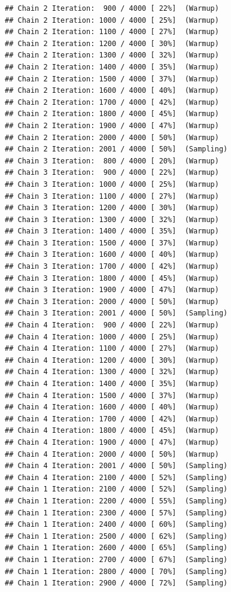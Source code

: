 \documentclass[
]{article}
\begin{document}
\begin{verbatim}
## Chain 2 Iteration:  900 / 4000 [ 22%]  (Warmup) 
## Chain 2 Iteration: 1000 / 4000 [ 25%]  (Warmup) 
## Chain 2 Iteration: 1100 / 4000 [ 27%]  (Warmup) 
## Chain 2 Iteration: 1200 / 4000 [ 30%]  (Warmup) 
## Chain 2 Iteration: 1300 / 4000 [ 32%]  (Warmup) 
## Chain 2 Iteration: 1400 / 4000 [ 35%]  (Warmup) 
## Chain 2 Iteration: 1500 / 4000 [ 37%]  (Warmup) 
## Chain 2 Iteration: 1600 / 4000 [ 40%]  (Warmup) 
## Chain 2 Iteration: 1700 / 4000 [ 42%]  (Warmup) 
## Chain 2 Iteration: 1800 / 4000 [ 45%]  (Warmup) 
## Chain 2 Iteration: 1900 / 4000 [ 47%]  (Warmup) 
## Chain 2 Iteration: 2000 / 4000 [ 50%]  (Warmup) 
## Chain 2 Iteration: 2001 / 4000 [ 50%]  (Sampling) 
## Chain 3 Iteration:  800 / 4000 [ 20%]  (Warmup) 
## Chain 3 Iteration:  900 / 4000 [ 22%]  (Warmup) 
## Chain 3 Iteration: 1000 / 4000 [ 25%]  (Warmup) 
## Chain 3 Iteration: 1100 / 4000 [ 27%]  (Warmup) 
## Chain 3 Iteration: 1200 / 4000 [ 30%]  (Warmup) 
## Chain 3 Iteration: 1300 / 4000 [ 32%]  (Warmup) 
## Chain 3 Iteration: 1400 / 4000 [ 35%]  (Warmup) 
## Chain 3 Iteration: 1500 / 4000 [ 37%]  (Warmup) 
## Chain 3 Iteration: 1600 / 4000 [ 40%]  (Warmup) 
## Chain 3 Iteration: 1700 / 4000 [ 42%]  (Warmup) 
## Chain 3 Iteration: 1800 / 4000 [ 45%]  (Warmup) 
## Chain 3 Iteration: 1900 / 4000 [ 47%]  (Warmup) 
## Chain 3 Iteration: 2000 / 4000 [ 50%]  (Warmup) 
## Chain 3 Iteration: 2001 / 4000 [ 50%]  (Sampling) 
## Chain 4 Iteration:  900 / 4000 [ 22%]  (Warmup) 
## Chain 4 Iteration: 1000 / 4000 [ 25%]  (Warmup) 
## Chain 4 Iteration: 1100 / 4000 [ 27%]  (Warmup) 
## Chain 4 Iteration: 1200 / 4000 [ 30%]  (Warmup) 
## Chain 4 Iteration: 1300 / 4000 [ 32%]  (Warmup) 
## Chain 4 Iteration: 1400 / 4000 [ 35%]  (Warmup) 
## Chain 4 Iteration: 1500 / 4000 [ 37%]  (Warmup) 
## Chain 4 Iteration: 1600 / 4000 [ 40%]  (Warmup) 
## Chain 4 Iteration: 1700 / 4000 [ 42%]  (Warmup) 
## Chain 4 Iteration: 1800 / 4000 [ 45%]  (Warmup) 
## Chain 4 Iteration: 1900 / 4000 [ 47%]  (Warmup) 
## Chain 4 Iteration: 2000 / 4000 [ 50%]  (Warmup) 
## Chain 4 Iteration: 2001 / 4000 [ 50%]  (Sampling) 
## Chain 4 Iteration: 2100 / 4000 [ 52%]  (Sampling) 
## Chain 1 Iteration: 2100 / 4000 [ 52%]  (Sampling) 
## Chain 1 Iteration: 2200 / 4000 [ 55%]  (Sampling) 
## Chain 1 Iteration: 2300 / 4000 [ 57%]  (Sampling) 
## Chain 1 Iteration: 2400 / 4000 [ 60%]  (Sampling) 
## Chain 1 Iteration: 2500 / 4000 [ 62%]  (Sampling) 
## Chain 1 Iteration: 2600 / 4000 [ 65%]  (Sampling) 
## Chain 1 Iteration: 2700 / 4000 [ 67%]  (Sampling) 
## Chain 1 Iteration: 2800 / 4000 [ 70%]  (Sampling) 
## Chain 1 Iteration: 2900 / 4000 [ 72%]  (Sampling) 

\end{verbatim}
\end{document}
